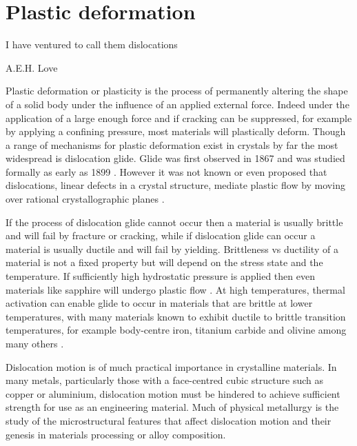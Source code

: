 
\chapter{Plastic deformation}  %
\label{chap:plastic_deformation}

\epigraph{I have ventured to call them dislocations}{A.E.H. Love}




\graphicspath{{plastic_deformation/Figs/}}

Plastic deformation or plasticity is the process of permanently altering the shape of a solid body under the influence of an applied external force. Indeed under the application of a large enough force and if cracking can be suppressed, for example by applying a confining pressure, most materials will plastically deform. Though a range of mechanisms for plastic deformation exist in crystals by far the most widespread is dislocation glide. Glide was first observed in 1867 \cite{Reusch1867} and was studied formally as early as 1899 \cite{Ewing1899,Ewing1900}. However it was not known or even proposed that dislocations, linear defects in a crystal structure, mediate plastic flow by moving over rational crystallographic planes \cite{Kelly2012ch7}.

If the process of dislocation glide cannot occur then a material is usually {brittle} and will fail by fracture or cracking, while if dislocation glide can occur a material is usually {ductile} and will fail by yielding. Brittleness vs ductility of a material is not a fixed property but will depend on the stress state and the temperature. If sufficiently high hydrostatic pressure is applied then even materials like sapphire will undergo plastic flow \cite{Bridgman1947}. At high temperatures, thermal activation can enable glide to occur in materials that are brittle at lower temperatures, with many materials known to exhibit ductile to brittle transition temperatures, for example body-centre iron, titanium carbide and olivine among many others   \cite{Kelly2012ch7,frost1982,Rowcliffe1971,Darot1985}.

Dislocation motion is of much practical importance in crystalline materials. In many metals, particularly those with a face-centred cubic structure such as copper or aluminium, dislocation motion must be hindered to achieve sufficient strength for use as an engineering material. Much of physical metallurgy is the study of the microstructural features that affect dislocation motion and their genesis in materials processing or alloy composition.

